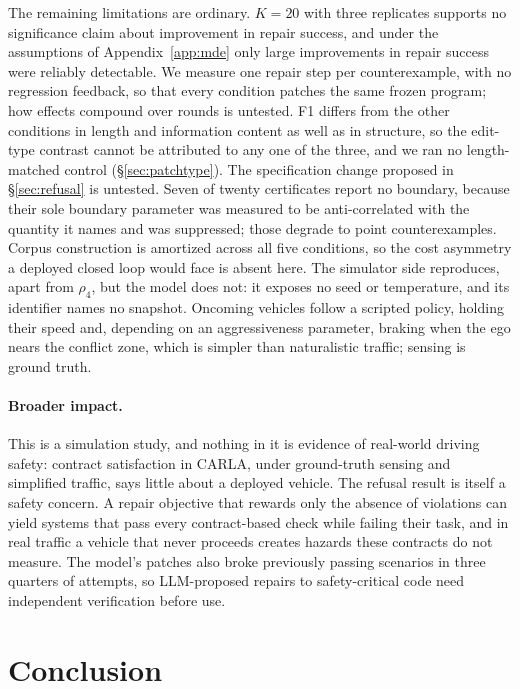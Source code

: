 \documentclass{article}
\newcommand{\rhoc}[1]{\rho_{#1}}
\begin{document}
The remaining limitations are ordinary. $K{=}20$ with three replicates supports no
significance claim about improvement in repair success, and under the assumptions of Appendix~\ref{app:mde} only
large improvements in repair success were reliably detectable. We measure one repair step
per counterexample, with no regression feedback, so that every condition patches
the same frozen program; how effects compound over rounds is untested. F1 differs from the other conditions in length and information
content as well as in structure, so the edit-type contrast cannot be attributed
to any one of the three, and we ran no length-matched control
(\S\ref{sec:patchtype}). The specification change proposed in
\S\ref{sec:refusal} is untested. Seven of twenty certificates report no boundary, because
their sole boundary parameter was measured to be anti-correlated with the quantity
it names and was suppressed; those degrade to point counterexamples. Corpus
construction is amortized across all five conditions, so the cost asymmetry a
deployed closed loop would face is absent here. The simulator side reproduces,
apart from $\rhoc{4}$, but the model does not: it exposes no seed or temperature,
and its identifier names no snapshot.
Oncoming vehicles follow a scripted policy, holding their speed and, depending on
an aggressiveness parameter, braking when the ego nears the conflict zone, which
is simpler than naturalistic traffic; sensing is ground truth.

\paragraph{Broader impact.} This is a simulation study, and nothing in it is
evidence of real-world driving safety: contract satisfaction in CARLA, under
ground-truth sensing and simplified traffic, says little about a deployed
vehicle. The refusal result is itself a safety concern. A repair objective that
rewards only the absence of violations can yield systems that pass every
contract-based check while failing their task, and in real traffic a vehicle that
never proceeds creates hazards these contracts do not measure. The model's
patches also broke previously passing scenarios in three quarters of attempts,
so LLM-proposed repairs to safety-critical code need independent verification
before use.

\section{Conclusion}
\end{document}
